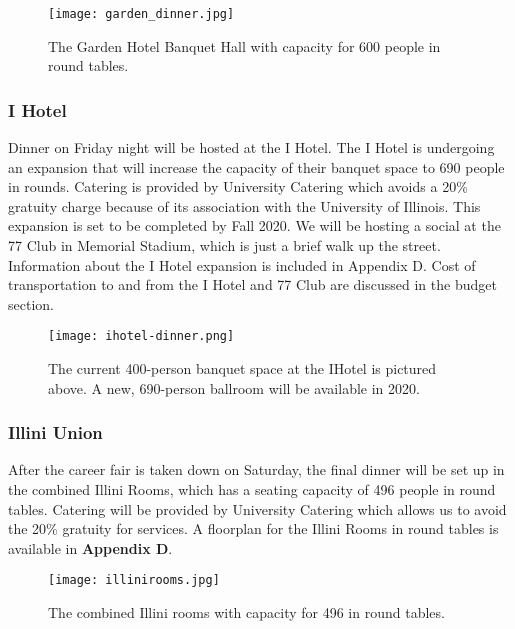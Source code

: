 \begin{figure}[H]
    \centering
    \texttt{[image: garden\_dinner.jpg]}
    \caption{The Garden Hotel Banquet Hall with capacity for 600 people in round tables.}
\end{figure}

\subsubsection{I Hotel}

Dinner on Friday night will be hosted at the I Hotel. The I Hotel is undergoing an expansion that will increase the capacity of their banquet space to 690 people in rounds. Catering is provided by University Catering which avoids a 20\% gratuity charge because of its association with the University of Illinois. This expansion is set to be completed by Fall 2020. We will be hosting a social at the 77 Club in Memorial Stadium, which is just a brief walk up the street. Information about the I Hotel expansion is included in Appendix D. Cost of transportation to and from the I Hotel and 77 Club are discussed in the budget section.

\begin{figure}[H]
    \centering
    \texttt{[image: ihotel-dinner.png]}
    \caption{The current 400-person banquet space at the IHotel is pictured 
        above. A new, 690-person ballroom will be available in 2020.}
\end{figure}

\subsubsection{Illini Union}
After the career fair is taken down on Saturday, the final dinner will be set up in the combined Illini Rooms, which has a seating capacity of 496 people in round tables. Catering will be provided by University Catering which allows us to avoid the 20\% gratuity for services. A floorplan for the Illini Rooms in round tables is available in \textbf{Appendix D}.\\


\begin{figure}[H]
    \centering
    \texttt{[image: illinirooms.jpg]}
    \caption{The combined Illini rooms with capacity for 496 in round tables.}
\end{figure}


